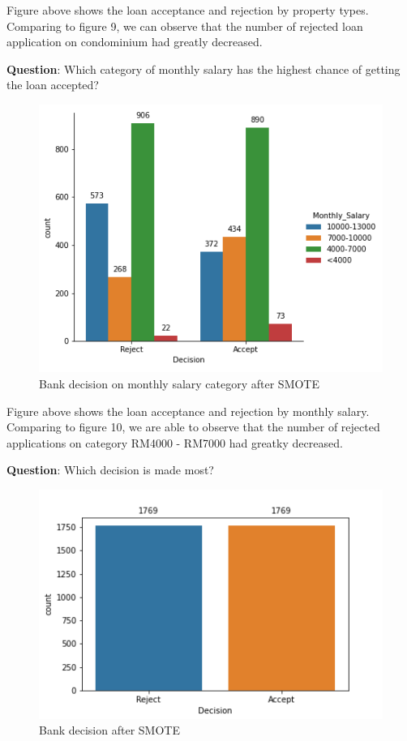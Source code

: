 \documentclass[11pt]{article}
\begin{document}
Figure above shows the loan acceptance and rejection by property types. Comparing to figure 9, we can observe that the number of rejected loan application on condominium had greatly decreased.
\clearpage

\noindent \textbf{Question}: Which category of monthly salary has the highest chance of getting the loan accepted?
\begin{figure}[h]
\centerline{\includegraphics[scale=0.8]{aSMOTE_dcs_month_salary.png} }
\label{fig:aSmoteDCSmonthsalary}
\caption{Bank decision on monthly salary category after SMOTE}
\end{figure}

Figure above shows the loan acceptance and rejection by monthly salary. Comparing to figure 10, we are able to observe that the number of rejected applications on category RM4000 - RM7000 had greatky decreased.
\clearpage

\noindent \textbf{Question}: Which decision is made most?
\begin{figure}[h]
\centerline{\includegraphics[scale=0.8]{aSMOTE_dcs_bank.png} }
\label{fig:aSmoteDCSbank}
\caption{Bank decision after SMOTE}
\end{figure}
\end{document}
